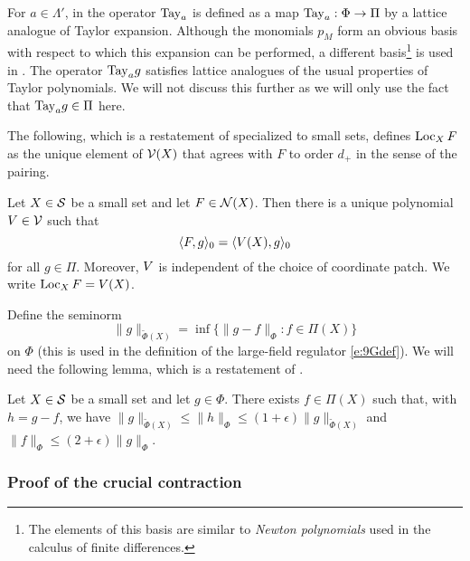 For $a\in\Lambda'$, in \cite{BS-rg-loc} the operator ${\rm Tay}_a$ is defined as a map
${\rm Tay}_a : \Phi \rightarrow \Pi$
by a lattice analogue of Taylor expansion. Although the monomials $p_M$ form an obvious
basis with respect to which this expansion can be performed, a different
basis\footnote{The elements of this basis are similar to \emph{Newton polynomials} used
in the calculus of finite differences.} is used in
\cite{BS-rg-loc}. The operator ${\rm Tay}_a g$ satisfies lattice analogues of the usual properties
of Taylor polynomials. We will not discuss this further as we will only use the fact
that ${\rm Tay}_a g \in \Pi$ here.

The following, which is a restatement of \cite[Proposition~\ref{loc-prop:LTsymexists}]{BS-rg-IE}
specialized to small sets,
defines $\operatorname{Loc}_X F$ as the unique element of $\mathcal{V}(X)$ that agrees with $F$ to
order $d_+$ in the sense of the pairing.

\begin{prop}
\label{prop:LTsymexists}
Let $X\in\mathcal{S}$ be a small set and let $F\in\mathcal{N}(X)$.
Then there is a unique polynomial $V\in\mathcal{V}$ such that
\begin{equation}
\langle F, g \rangle_0 = \langle V(X), g \rangle_0
\end{equation}
for all $g\in\Pi$. Moreover, $V$ is independent of the
choice of coordinate patch. We write $\operatorname{Loc}_X F = V(X)$.
\end{prop}

Define the seminorm
\begin{equation}
\label{e:Phitilde}
\|g\|_{\tilde\Phi(X)} = \inf\{ \|g - f\|_\Phi : f\in\Pi(X) \}
\end{equation}
on $\Phi$ (this is used in the definition of the large-field
regulator \eqref{e:9Gdef}).
We will need the following lemma, which is a restatement of
\cite[Lemma~\ref{loc-lem:testfndecomp}]{BS-rg-loc}.

\begin{lemma}
\label{lem:testfndecomp}
Let $X\in\mathcal{S}$ be a small set and let $g\in\Phi$.
There exists $f\in\Pi(X)$ such that, with $h = g - f$, we have
$\|g\|_{\tilde\Phi(X)} \le \|h\|_\Phi \le (1 + \epsilon) \|g\|_{\tilde\Phi(X)}$
and $\|f\|_\Phi \le (2 + \epsilon) \|g\|_\Phi$.
\end{lemma}

\subsubsection{Proof of the crucial contraction}

